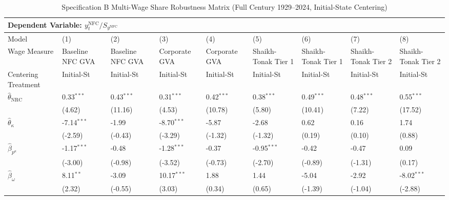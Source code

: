 \begin{landscape}
\begin{table}[H]
\centering
\caption{Specification B Multi-Wage Share Robustness Matrix (Full Century 1929--2024, Initial-State Centering)}
\label{tab:specB_wageshares}
\small
\begin{tabular}{p{5.0cm}p{1.5cm}p{1.5cm}p{1.5cm}p{1.5cm}p{1.5cm}p{1.5cm}p{1.5cm}p{1.5cm}}
\toprule
\multicolumn{9}{l}{\textbf{Dependent Variable: $y_t^{\text{NFC}} / S_{y^{\text{NFC}}}$}} \\
\midrule
Model & (1) & (2) & (3) & (4) & (5) & (6) & (7) & (8)  \\
Wage Measure & Baseline NFC GVA & Baseline NFC GVA & Corporate GVA & Corporate GVA & Shaikh-Tonak Tier 1 & Shaikh-Tonak Tier 1 & Shaikh-Tonak Tier 2 & Shaikh-Tonak Tier 2  \\
Centering Treatment & Initial-St & Initial-St & Initial-St & Initial-St & Initial-St & Initial-St & Initial-St & Initial-St  \\
\midrule
$\hat{\theta}_{\text{NRC}}$ & 0.33$^{***}$ & 0.43$^{***}$ & 0.31$^{***}$ & 0.42$^{***}$ & 0.38$^{***}$ & 0.49$^{***}$ & 0.48$^{***}$ & 0.55$^{***}$  \\
 & {\scriptsize (4.62)} & {\scriptsize (11.16)} & {\scriptsize (4.53)} & {\scriptsize (10.78)} & {\scriptsize (5.80)} & {\scriptsize (10.41)} & {\scriptsize (7.22)} & {\scriptsize (17.52)}  \\
$\hat{\theta}_{\kappa}$ & -7.14$^{***}$ & -1.99 & -8.70$^{***}$ & -5.87 & -2.68 & 0.62 & 0.16 & 1.74  \\
 & {\scriptsize (-2.59)} & {\scriptsize (-0.43)} & {\scriptsize (-3.29)} & {\scriptsize (-1.32)} & {\scriptsize (-1.32)} & {\scriptsize (0.19)} & {\scriptsize (0.10)} & {\scriptsize (0.88)}  \\
$\hat{\beta}_{p^{\kappa}}$ & -1.17$^{***}$ & -0.48 & -1.28$^{***}$ & -0.37 & -0.95$^{***}$ & -0.42 & -0.47 & 0.09  \\
 & {\scriptsize (-3.00)} & {\scriptsize (-0.98)} & {\scriptsize (-3.52)} & {\scriptsize (-0.73)} & {\scriptsize (-2.70)} & {\scriptsize (-0.89)} & {\scriptsize (-1.31)} & {\scriptsize (0.17)}  \\
$\hat{\beta}_{\omega}$ & 8.11$^{**}$ & -3.09 & 10.17$^{***}$ & 1.88 & 1.44 & -5.04 & -2.92 & -8.02$^{***}$  \\
 & {\scriptsize (2.32)} & {\scriptsize (-0.55)} & {\scriptsize (3.03)} & {\scriptsize (0.34)} & {\scriptsize (0.65)} & {\scriptsize (-1.39)} & {\scriptsize (-1.04)} & {\scriptsize (-2.88)}  \\

\end{tabular}
\end{table}
\end{landscape}
